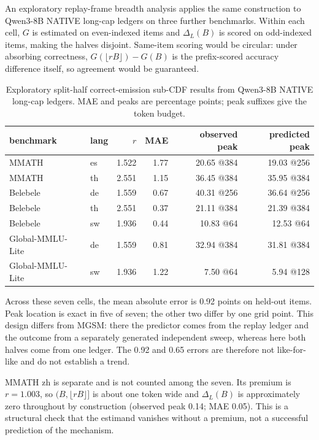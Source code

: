 \documentclass[11pt]{article}
\begin{document}
An exploratory replay-frame breadth analysis applies the same construction to
Qwen3-8B NATIVE long-cap ledgers on three further benchmarks. Within each cell,
\(G\) is estimated on even-indexed items and \(\Delta_L(B)\) is scored on
odd-indexed items, making the halves disjoint. Same-item scoring would be
circular: under absorbing correctness,
\(G(\lfloor rB\rfloor)-G(B)\) is the prefix-scored accuracy difference itself,
so agreement would be guaranteed.

\begin{table}[t]
\centering
\small
\caption{Exploratory split-half correct-emission sub-CDF results from Qwen3-8B
NATIVE long-cap ledgers. MAE and peaks are percentage points; peak suffixes
give the token budget.}
\label{tab:subcdf-breadth}
\begin{tabular}{llrrrr}
\toprule
benchmark & lang & \(r\) & MAE & observed peak & predicted peak \\
\midrule
MMATH & es & 1.522 & 1.77 & 20.65 @384 & 19.03 @256 \\
MMATH & th & 2.551 & 1.15 & 36.45 @384 & 35.95 @384 \\
Belebele & de & 1.559 & 0.67 & 40.31 @256 & 36.64 @256 \\
Belebele & th & 2.551 & 0.37 & 21.11 @384 & 21.39 @384 \\
Belebele & sw & 1.936 & 0.44 & 10.83 @64 & 12.53 @64 \\
Global-MMLU-Lite & de & 1.559 & 0.81 & 32.94 @384 & 31.81 @384 \\
Global-MMLU-Lite & sw & 1.936 & 1.22 & 7.50 @64 & 5.94 @128 \\
\bottomrule
\end{tabular}
\end{table}

Across these seven cells, the mean absolute error is 0.92 points on held-out
items. Peak location is exact in five of seven; the other two differ by one grid
point. This design differs from MGSM: there the predictor comes from the replay
ledger and the outcome from a separately generated independent sweep, whereas
here both halves come from one ledger. The 0.92 and 0.65 errors are therefore
not like-for-like and do not establish a trend.

MMATH zh is separate and is not counted among the seven. Its premium is
\(r=1.003\), so \((B,\lfloor rB\rfloor]\) is about one token wide and
\(\Delta_L(B)\) is approximately zero throughout by construction (observed
peak 0.14; MAE 0.05). This is a structural check that the estimand vanishes
without a premium, not a successful prediction of the mechanism.
\end{document}
